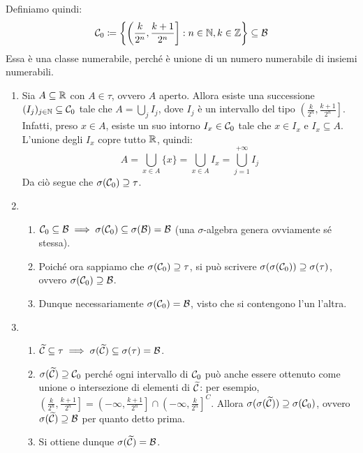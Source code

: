 \begin{dimo}
  Definiamo quindi:
  $$\mathcal C_0 \coloneqq \left\{ \left( \frac{k}{2^n}, \frac{k+1}{2^n} \right] : n \in \mathbb N, k \in \mathbb Z \right\} \subseteq \mathcal B$$
  Essa è una classe numerabile, perché è unione di un numero numerabile di insiemi numerabili.
  \begin{enumerate}
    \item Sia $A \subseteq \mathbb R$ con $A \in \tau$, ovvero $A$ aperto.
    Allora esiste una successione $(I_j)_{j \in \mathbb N} \subseteq \mathcal C_0$ tale che $ A = \bigcup_{j} I_j$,
      dove $I_j$ è un intervallo del tipo $\left(\frac{k}{2^n}, \frac{k+1}{2^n}\right]$.
      Infatti, preso $x \in A$, esiste un suo intorno $ I_x  \in \mathcal C_0$ tale che $x \in I_x$ e $I_x \subseteq A$. L'unione degli $I_x$ copre tutto $\mathbb R$, quindi:
      $$A = \bigcup\limits_{x \in A} \{x\} = \bigcup\limits_{x \in A} I_x = \bigcup\limits_{j = 1}^{+\infty} I_j$$
      Da ciò segue che $\sigma(\mathcal C_0) \supseteq \tau$.
    \item \begin{enumerate}
        \item $\mathcal C_0 \subseteq \mathcal B \implies \sigma(\mathcal C_0) \subseteq \sigma(\mathcal B) = \mathcal B$ (una $\sigma$-algebra genera ovviamente sé stessa).
        \item Poiché ora sappiamo che $\sigma(\mathcal C_0) \supseteq \tau$, si può scrivere $\sigma(\sigma(\mathcal C_0)) \supseteq \sigma(\tau)$, ovvero $\sigma(\mathcal C_0) \supseteq \mathcal B$.
        \item Dunque necessariamente $\sigma (\mathcal C_0) = \mathcal B$, visto che si contengono l'un l'altra.
      \end{enumerate}
    \item \begin{enumerate}
        \item $\widetilde{\mathcal C} \subseteq \tau \implies \sigma(\widetilde{\mathcal C}) \subseteq \sigma(\tau) = \mathcal B$.
        \item $\sigma(\widetilde{\mathcal C}) \supseteq \mathcal C_0$ perché ogni intervallo di $\mathcal C_0$ può anche essere ottenuto come unione o intersezione di elementi di $\widetilde{\mathcal C}$: per esempio, $\left(\frac k {2^n}, \frac{k+1}{2^n}\right] = \left(-\infty,\frac{k+1}{2^n}\right] \cap \left(-\infty,\frac k {2^n}\right]^C$. Allora $ \sigma(\sigma(\widetilde{\mathcal C})) \supseteq \sigma(\mathcal C_0)$, ovvero $\sigma(\widetilde{\mathcal C}) \supseteq \mathcal B$ per quanto detto prima.
        \item Si ottiene dunque $\sigma(\widetilde{\mathcal C}) =\mathcal B$.
      \end{enumerate}


\end{enumerate}
\end{dimo}
